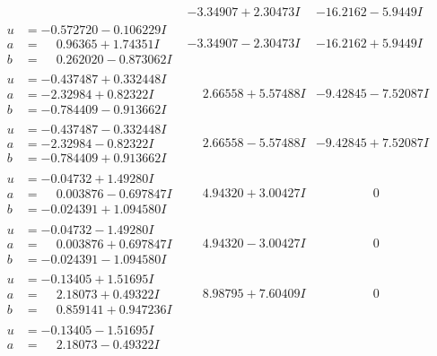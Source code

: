 \documentclass[1p]{elsarticle_modified}
\theoremstyle{definition}
\begin{document}
$$\begin{array}{c|c|c}
 & -3.34907 + 2.30473 I & -16.2162 - 5.9449 I \\ \hline\begin{aligned}
u &= -0.572720 - 0.106229 I \\
a &= \phantom{-}0.96365 + 1.74351 I \\
b &= \phantom{-}0.262020 - 0.873062 I\end{aligned}
 & -3.34907 - 2.30473 I & -16.2162 + 5.9449 I \\ \hline\begin{aligned}
u &= -0.437487 + 0.332448 I \\
a &= -2.32984 + 0.82322 I \\
b &= -0.784409 - 0.913662 I\end{aligned}
 & \phantom{-}2.66558 + 5.57488 I & -9.42845 - 7.52087 I \\ \hline\begin{aligned}
u &= -0.437487 - 0.332448 I \\
a &= -2.32984 - 0.82322 I \\
b &= -0.784409 + 0.913662 I\end{aligned}
 & \phantom{-}2.66558 - 5.57488 I & -9.42845 + 7.52087 I \\ \hline\begin{aligned}
u &= -0.04732 + 1.49280 I \\
a &= \phantom{-}0.003876 - 0.697847 I \\
b &= -0.024391 + 1.094580 I\end{aligned}
 & \phantom{-}4.94320 + 3.00427 I & \phantom{-0.000000 } 0 \\ \hline\begin{aligned}
u &= -0.04732 - 1.49280 I \\
a &= \phantom{-}0.003876 + 0.697847 I \\
b &= -0.024391 - 1.094580 I\end{aligned}
 & \phantom{-}4.94320 - 3.00427 I & \phantom{-0.000000 } 0 \\ \hline\begin{aligned}
u &= -0.13405 + 1.51695 I \\
a &= \phantom{-}2.18073 + 0.49322 I \\
b &= \phantom{-}0.859141 + 0.947236 I\end{aligned}
 & \phantom{-}8.98795 + 7.60409 I & \phantom{-0.000000 } 0 \\ \hline\begin{aligned}
u &= -0.13405 - 1.51695 I \\
a &= \phantom{-}2.18073 - 0.49322 I \\

\end{aligned}
\end{array}$$
\end{document}
